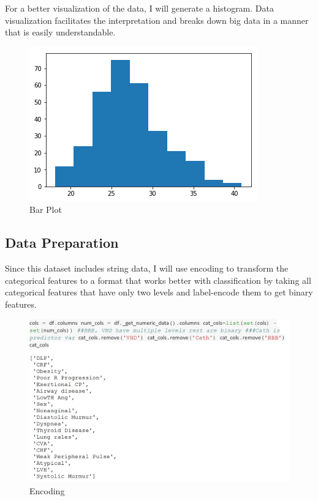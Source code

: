 \documentclass[sigconf]{acmart}
\begin{document}
For a better visualization of the data, I will generate a histogram.
Data visualization facilitates the interpretation and breaks down big data in a manner that is easily understandable.
\begin{figure}
    \centering
    \includegraphics[width=1.0\columnwidth]{project/images/output_2_0.png}
    \caption{Bar Plot}
    \label{Plot}
\end{figure}



\subsection{Data Preparation}
Since this dataset includes string data, I will use encoding to transform the categorical features to a format that works better with classification by taking all categorical features that have only two levels and label-encode them to get binary features.

\begin{figure}
    \centering
    \includegraphics[width=1.0\columnwidth]{project/images/Untitled3.png}
    \caption{Encoding}
    \label{Encoding}
\end{figure}
\end{document}
